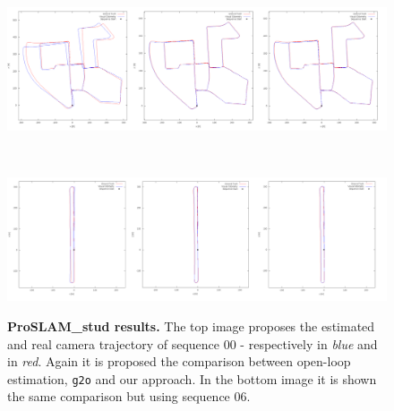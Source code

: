\begin{figure}[!hbt] %
    \centering
    \begin{minipage}[t!]{0.9\textwidth}
        \centering
        \includegraphics[width=\textwidth]{figures/use_cases/froslam_kitti00.png}
        \label{fig:froslam_stud_kitti_00}
    \end{minipage}\\
    \begin{minipage}[t!]{0.9\textwidth}
        \centering
        \includegraphics[width=\textwidth]{figures/use_cases/froslam_kitti06.png}
        \label{fig:froslam_stud_kitti_06}
    \end{minipage}%
    
    \caption{\textbf{ProSLAM\_stud results.} The top image proposes the estimated and real camera trajectory of sequence 00 - respectively in \textit{blue} and in \textit{red}. Again it is proposed the comparison between open-loop estimation, \texttt{g2o} and our approach. In the bottom image it is shown the same comparison but using sequence 06.} 
    \label{fig:froslam_stud_kitti}
\end{figure}

